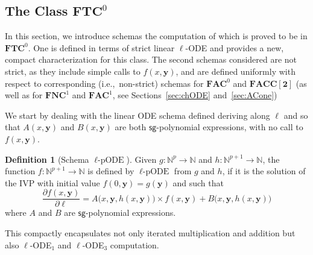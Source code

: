 \documentclass[11pt, oneside]{article}
\newcommand{\fun}[1]{\mathsf{#1}}
\newcommand{\sB}{B}
\newcommand{\sA}{A}
\newcommand{\Nat}{\mathbb{N}}
\newcommand{\NC}{\mathbf{FNC}}
\newcommand{\AC}{\mathbf{FAC}}
\newcommand{\TC}{\mathbf{FTC}}
\newcommand{\FACC}{\mathbf{FACC[2]}}
\newcommand{\tu}[1]{\mathbf{#1}}
\theoremstyle{definition}
\newtheorem{defn}{Definition}
\newcommand{\pODE}{\ell\text{-pODE}}
\begin{document}
\subsection{The Class $\TC^0$}\label{sec:TC}
In this section, we introduce schemas the computation of which is proved to be in $\TC^0$.
%
One is defined in terms of strict linear $\ell$-ODE and provides a new, compact characterization for this class.
%
The second schemas considered are not strict, as they include simple calls to $f(x,\tu y)$, and are defined uniformly with respect to corresponding (i.e.,~non-strict) schemas for $\AC^0$ and $\FACC$ (as well as for $\NC^1$ and $\AC^1$, see  Sections~\ref{sec:chODE} and~\ref{sec:ACone})


We start by dealing with the linear ODE schema defined deriving along $\ell$ and so that $\sA(x, \tu y)$ and $\sB (x, \tu y)$ are both  $\fun{sg}$-polynomial expressions, with no call to $f(x, \tu y)$.




\begin{defn}[Schema $\pODE$]
    Given $g: \Nat^p \to \Nat$ and $h:\Nat^{p+1} \to \Nat$, the function $f:\Nat^{p+1}\to \Nat$ is defined by $\pODE$ from $g$ and $h$, if it is the solution of the IVP with initial value $f(0, \tu y) = g(\tu y)$  and such that
    $$
    \frac{\partial f(x, \tu y)}{\partial \ell} = \sA \big(x, \tu y, h(x, \tu y)\big) \times f(x, \tu y) + \sB\big(x, \tu y, h(x, \tu y)\big)
    $$
    where $\sA$ and $\sB$ are $\fun{sg}$-polynomial expressions.
\end{defn}
\noindent
This compactly encapsulates not only iterated multiplication and addition but also $\ell$-ODE$_1$ and $\ell$-ODE$_3$ computation.
\end{document}
